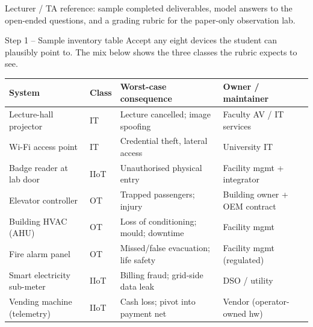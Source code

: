 \documentclass[11pt,a4paper]{article}
\begin{document}
\labheader

\begin{goalbox}
Lecturer / TA reference: sample completed deliverables, model answers
to the open-ended questions, and a grading rubric for the paper-only
observation lab.
\end{goalbox}

\begin{solutionbox}{Step 1 -- Sample inventory table}
Accept any eight devices the student can plausibly point to. The mix
below shows the three classes the rubric expects to see.

\vspace{2pt}
\small
\begin{tabular}{@{}p{2.7cm}p{1.1cm}p{4.6cm}p{4.4cm}@{}}
\toprule
\textbf{System} & \textbf{Class} & \textbf{Worst-case consequence} & \textbf{Owner / maintainer} \\
\midrule
Lecture-hall projector       & IT    & Lecture cancelled; image spoofing      & Faculty AV / IT services \\
Wi-Fi access point           & IT    & Credential theft, lateral access       & University IT \\
Badge reader at lab door     & IIoT  & Unauthorised physical entry            & Facility mgmt + integrator \\
Elevator controller          & OT    & Trapped passengers; injury             & Building owner + OEM contract \\
Building HVAC (AHU)          & OT    & Loss of conditioning; mould; downtime  & Facility mgmt \\
Fire alarm panel             & OT    & Missed/false evacuation; life safety   & Facility mgmt (regulated) \\
Smart electricity sub-meter  & IIoT  & Billing fraud; grid-side data leak     & DSO / utility \\
Vending machine (telemetry)  & IIoT  & Cash loss; pivot into payment net      & Vendor (operator-owned hw) \\
\bottomrule
\end{tabular}
\normalsize
\end{solutionbox}
\end{document}
